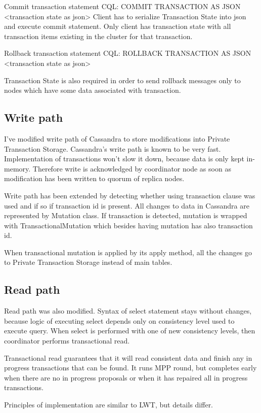 Commit transaction statement
CQL: COMMIT TRANSACTION AS JSON <transaction state as json>
Client has to serialize Transaction State into json and execute commit statement. Only client has transaction state with all transaction items existing in the cluster for that transaction.


Rollback transaction statement
CQL: ROLLBACK TRANSACTION AS JSON <transaction state as json>


Transaction State is also required in order to send rollback messages only to nodes which have some data associated with transaction.




\subsection{Write path}
I’ve modified write path of Cassandra to store modifications into Private Transaction Storage.
Cassandra’s write path is known to be very fast. Implementation of transactions won’t slow it down, because data is only kept in-memory. Therefore write is acknowledged by coordinator node as soon as modification has been written to quorum of replica nodes.


Write path has been extended by detecting whether using transaction clause was used and if so if transaction id is present. All changes to data in Cassandra are represented by Mutation class. If transaction is detected, mutation is wrapped with TransactionalMutation which besides having mutation has also transaction id.


When transactional mutation is applied by its apply method, all the changes go to Private Transaction Storage instead of main tables.


\subsection{Read path}
Read path was also modified. Syntax of select statement stays without changes, because logic of executing select depends only on consistency level used to execute query.  When select is performed with one of new consistency levels, then coordinator performs transactional read.


Transactional read guarantees that it will read consistent data and finish any in progress transactions that can be found. It runs MPP round, but completes early when there are no in progress proposals or when it has repaired all in progress transactions.


Principles of implementation are similar to LWT, but details differ.


